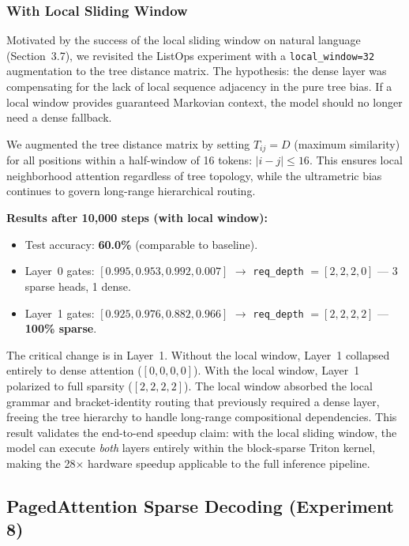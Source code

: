 \documentclass[11pt,a4paper]{article}
\begin{document}
\subsubsection{With Local Sliding Window}
\label{sec:listops-window}

Motivated by the success of the local sliding window on natural language (Section~3.7), we revisited the ListOps experiment with a \texttt{local\_window=32} augmentation to the tree distance matrix. The hypothesis: the dense layer was compensating for the lack of local sequence adjacency in the pure tree bias. If a local window provides guaranteed Markovian context, the model should no longer need a dense fallback.

We augmented the tree distance matrix by setting $T_{ij} = D$ (maximum similarity) for all positions within a half-window of 16 tokens: $|i - j| \leq 16$. This ensures local neighborhood attention regardless of tree topology, while the ultrametric bias continues to govern long-range hierarchical routing.

\textbf{Results after 10,000 steps (with local window):}
\begin{itemize}
    \item Test accuracy: \textbf{60.0\%} (comparable to baseline).
    \item Layer~0 gates: $[0.995, 0.953, 0.992, 0.007]$ $\to$ \texttt{req\_depth} $= [2, 2, 2, 0]$ --- 3 sparse heads, 1 dense.
    \item Layer~1 gates: $[0.925, 0.976, 0.882, 0.966]$ $\to$ \texttt{req\_depth} $= [2, 2, 2, 2]$ --- \textbf{100\% sparse}.
\end{itemize}

The critical change is in Layer~1. Without the local window, Layer~1 collapsed entirely to dense attention ($[0, 0, 0, 0]$). With the local window, Layer~1 polarized to full sparsity ($[2, 2, 2, 2]$). The local window absorbed the local grammar and bracket-identity routing that previously required a dense layer, freeing the tree hierarchy to handle long-range compositional dependencies. This result validates the end-to-end speedup claim: with the local sliding window, the model can execute \emph{both} layers entirely within the block-sparse Triton kernel, making the 28$\times$ hardware speedup applicable to the full inference pipeline.

\subsection{PagedAttention Sparse Decoding (Experiment 8)}
\end{document}
